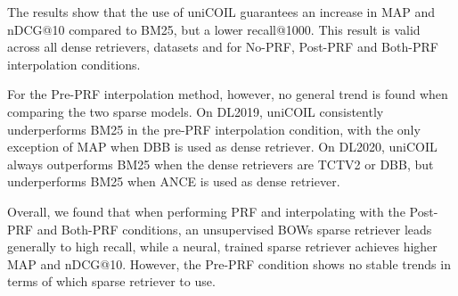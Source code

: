 
The results show that the use of uniCOIL guarantees an increase in MAP and nDCG@10 compared to BM25, but a lower recall@1000. This result is valid across all dense retrievers, datasets and for No-PRF, Post-PRF and Both-PRF interpolation conditions.



For the Pre-PRF interpolation method, however, no general trend is found when comparing the two sparse models.
On DL2019, uniCOIL consistently underperforms BM25 in the pre-PRF interpolation condition, with the only exception of MAP when DBB is used as dense retriever.
On DL2020, uniCOIL always outperforms BM25 when the dense retrievers are TCTV2 or DBB, but underperforms BM25 when ANCE is used as dense retriever.



Overall, we found that when performing PRF and interpolating with the Post-PRF and Both-PRF conditions, an unsupervised BOWs sparse retriever leads generally to high recall, while a neural, trained sparse retriever achieves higher MAP and nDCG@10. However, the Pre-PRF condition shows no stable trends in terms of which sparse retriever to use.

%




